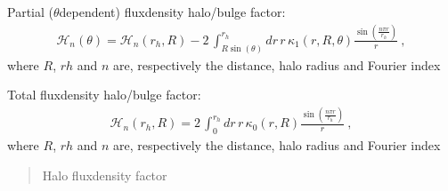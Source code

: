 \documentclass[letterpaper,10pt,english]{sphinxmanual}
\begin{document}

\begin{fulllineitems}
\label{\detokenize{diffsph.utils:diffsph.utils.tools.halo_fd}}
\pysigstartsignatures
{}
\pysigstopsignatures
\sphinxAtStartPar
Partial (\(\theta\)\sphinxhyphen{}dependent) flux\sphinxhyphen{}density halo/bulge factor:
\begin{equation*}
\begin{split}\mathcal H_n(\theta) = \mathcal H_n(r_h,R) - 2\,\int_{R\sin(\theta)}^{r_h}dr\, r\, \kappa_1(r,R,\theta) \frac{\sin\left(\frac{n\pi r}{r_h}\right)}r \ ,\end{split}
\end{equation*}
\sphinxAtStartPar
where \(R\), \(rh\) and \(n\) are, respectively the distance, halo radius and Fourier index

\end{fulllineitems}


\begin{fulllineitems}
\label{\detokenize{diffsph.utils:diffsph.utils.tools.halo_fd_tot}}
\pysigstartsignatures
{}
\pysigstopsignatures
\sphinxAtStartPar
Total flux\sphinxhyphen{}density halo/bulge factor:
\begin{equation*}
\begin{split}\mathcal H_n(r_h,R) = 2\,\int_0^{r_h}dr\, r\, \kappa_0(r,R) \frac{\sin\left(\frac{n\pi r}{r_h}\right)}r\ , \end{split}
\end{equation*}
\sphinxAtStartPar
where \(R\), \(rh\) and \(n\) are, respectively the distance, halo radius and Fourier index
\begin{quote}\begin{description}
\sphinxAtStartPar
Halo flux\sphinxhyphen{}density factor

\end{description}\end{quote}

\end{fulllineitems}
\end{document}
